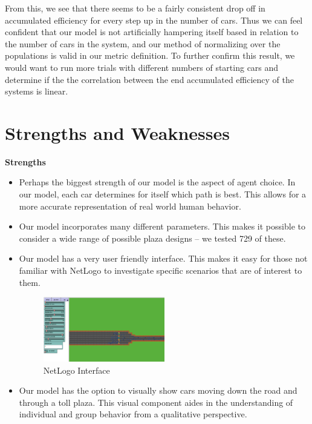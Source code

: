 \documentclass{article}
\begin{document}
From this, we see that there seems to be a fairly consistent drop off in accumulated efficiency for every step up in the number of cars. Thus we can feel confident that our model is not artificially hampering itself based in relation to the number of cars in the system, and our method of normalizing over the populations is valid in our metric definition. To further confirm this result, we would want to run more trials with different numbers of starting cars and determine if the the correlation between the end accumulated efficiency of the systems is linear. 

\section{Strengths and Weaknesses}
\textbf{Strengths}
\begin{itemize}
\item Perhaps the biggest strength of our model is the aspect of agent choice. In our model, each car determines for itself which path is best. This allows for a more accurate representation of real world human behavior.
\item Our model incorporates many different parameters. This makes it possible to consider a wide range of possible plaza designs -- we tested 729 of these.
\item Our model has a very user friendly interface. This makes it easy for those not familiar with NetLogo to investigate specific scenarios that are of interest to them.

\begin{figure}[H]
    \centering
    \includegraphics[width=0.5\textwidth]{display.png}
    \caption[width=0.8\textwidth]{NetLogo Interface}
\end{figure}

\item Our model has the option to visually show cars moving down the road and through a toll plaza. This visual component aides in the understanding of individual and group behavior from a qualitative perspective.
\end{itemize}
\end{document}
